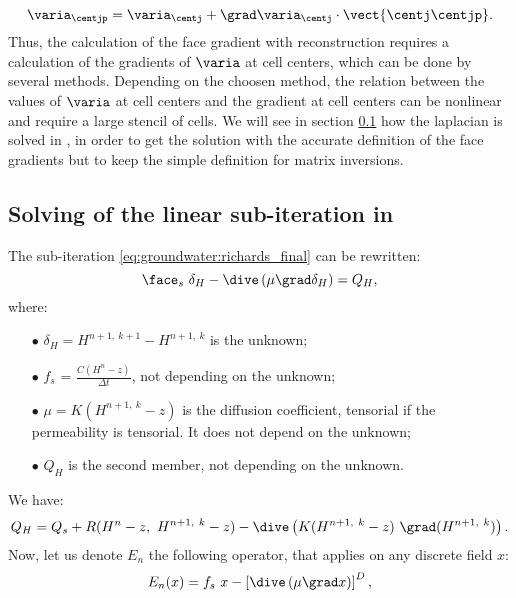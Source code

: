 \begin{equation}
 \label{104}
\varia_{\centjp} = \varia_{\centj} + \grad \varia_\centj \cdot \vect{\centj\centjp}.
\end{equation}
Thus, the calculation of the face gradient with reconstruction requires a calculation of the gradients of $\varia$ at cell centers, which can be done
by several methods. Depending on the choosen method, the relation between the values of $\varia$ at cell centers and the gradient at cell centers can
be nonlinear and require a large stencil of cells. We will see in section \ref{sec:groundwater:solving} how the laplacian is solved in \CS, in order to get the solution
with the accurate definition of the face gradients but to keep the simple definition for matrix inversions.

\subsection{Solving of the linear sub-iteration in \CS} \label{sec:groundwater:solving}
The sub-iteration \eqref{eq:groundwater:richards_final} can be rewritten:
\begin{equation}
 \label{eq:groundwater:solving_1}
\face_s \ \delta_H - \dive \left( \mu \grad \delta_H \right) = Q_H,
\end{equation}
where:
\begin{itemize}
\item[$\bullet$] $\delta_H = H^{ n+1, \ k+1} - H^{ n+1, \ k}$ is the unknown;
\item[$\bullet$] $f_s$ = $\frac{C(H^n-z)}{\Delta t}$, not depending on the unknown;
\item[$\bullet$] $\mu = K(H^{ n+1, \ k} - z)$ is the diffusion coefficient, tensorial if the permeability is tensorial. It does not depend on the unknown;
\item[$\bullet$] $Q_H$ is the second member, not depending on the unknown.
\end{itemize}
We have:
\begin{equation}
\label{qh}
Q_H = Q_s + R(H^n - z, \ H^{ n+1, \ k} - z) - \dive \left( K(H^{ n+1, \ k} - z) \
\grad(H^{ n+1, \ k}) \right).
\end{equation}
Now, let us denote $E_n$ the following operator, that applies on any discrete field $x$:
\begin{equation}
\label{epsilon}
E_n(x) = f_s \ x - \left[ \dive \left( \mu \grad x \right) \right]^D,
\end{equation}
